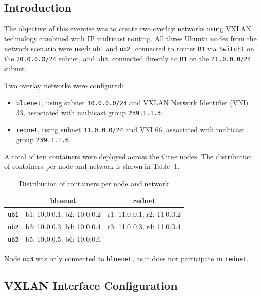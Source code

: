 \documentclass[12pt]{article}
\begin{document}
\subsection{Introduction}
 
The objective of this exercise was to create two overlay networks using VXLAN technology combined with IP multicast routing. All three Ubuntu nodes from the network scenario were used: \texttt{ub1} and \texttt{ub2}, connected to router \texttt{R1} via \texttt{Switch1} on the \texttt{20.0.0.0/24} subnet, and \texttt{ub3}, connected directly to \texttt{R1} on the \texttt{21.0.0.0/24} subnet.
 
Two overlay networks were configured:
 
\begin{itemize}
    \item \texttt{bluenet}, using subnet \texttt{10.0.0.0/24} and VXLAN Network Identifier (VNI) 33, associated with multicast group \texttt{239.1.1.3};
    \item \texttt{rednet}, using subnet \texttt{11.0.0.0/24} and VNI 66, associated with multicast group \texttt{239.1.1.6}.
\end{itemize}
 
A total of ten containers were deployed across the three nodes. The distribution of containers per node and network is shown in Table~\ref{tab:containers}.
 
\begin{table}[H]
\centering
\begin{tabular}{|c|c|c|}
\hline
 & \textbf{bluenet} & \textbf{rednet} \\
\hline
\texttt{ub1} & b1: 10.0.0.1, b2: 10.0.0.2 & r1: 11.0.0.1, r2: 11.0.0.2 \\
\hline
\texttt{ub2} & b3: 10.0.0.3, b4: 10.0.0.4 & r3: 11.0.0.3, r4: 11.0.0.4 \\
\hline
\texttt{ub3} & b5: 10.0.0.5, b6: 10.0.0.6 & --- \\
\hline
\end{tabular}
\caption{Distribution of containers per node and network}
\label{tab:containers}
\end{table}
 
Node \texttt{ub3} was only connected to \texttt{bluenet}, as it does not participate in \texttt{rednet}.
 
\subsection{VXLAN Interface Configuration}
 
\end{document}
